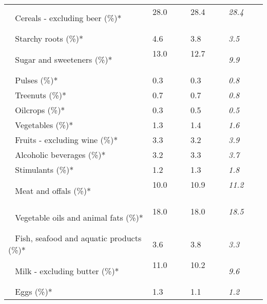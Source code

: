 \begin{tabular}{L{3.9cm} R{1cm} R{1cm} R{1cm}}
	 ~ Cereals - excluding beer (\%)* & 28.0 ~ \ \ & 28.4 ~ \ \ & \textit{28.4} ~ \ \ \\ 
	 ~ Starchy roots (\%)* & 4.6 ~ \ \ & 3.8 ~ \ \ & \textit{3.5} ~ \ \ \\ 
	 ~ Sugar and sweeteners (\%)* & 13.0 ~ \ \ & 12.7 ~ \ \ & \textit{9.9} ~ \ \ \\ 
	 ~ Pulses (\%)* & 0.3 ~ \ \ & 0.3 ~ \ \ & \textit{0.8} ~ \ \ \\ 
	 ~ Treenuts (\%)* & 0.7 ~ \ \ & 0.7 ~ \ \ & \textit{0.8} ~ \ \ \\ 
	 ~ Oilcrops (\%)* & 0.3 ~ \ \ & 0.5 ~ \ \ & \textit{0.5} ~ \ \ \\ 
	 ~ Vegetables (\%)* & 1.3 ~ \ \ & 1.4 ~ \ \ & \textit{1.6} ~ \ \ \\ 
	 ~ Fruits - excluding wine (\%)* & 3.3 ~ \ \ & 3.2 ~ \ \ & \textit{3.9} ~ \ \ \\ 
	 ~ Alcoholic beverages (\%)* & 3.2 ~ \ \ & 3.3 ~ \ \ & \textit{3.7} ~ \ \ \\ 
	 ~ Stimulants (\%)* & 1.2 ~ \ \ & 1.3 ~ \ \ & \textit{1.8} ~ \ \ \\ 
	 ~ Meat and offals (\%)* & 10.0 ~ \ \ & 10.9 ~ \ \ & \textit{11.2} ~ \ \ \\ 
	 ~ Vegetable oils and animal fats (\%)* & 18.0 ~ \ \ & 18.0 ~ \ \ & \textit{18.5} ~ \ \ \\ 
	 ~ Fish, seafood and aquatic products (\%)* & 3.6 ~ \ \ & 3.8 ~ \ \ & \textit{3.3} ~ \ \ \\ 
	 ~ Milk - excluding butter (\%)* & 11.0 ~ \ \ & 10.2 ~ \ \ & \textit{9.6} ~ \ \ \\ 
	 ~ Eggs (\%)* & 1.3 ~ \ \ & 1.1 ~ \ \ & \textit{1.2} ~ \ \ \\ 
       \toprule
      \end{tabular}
      \clearpage
{}
